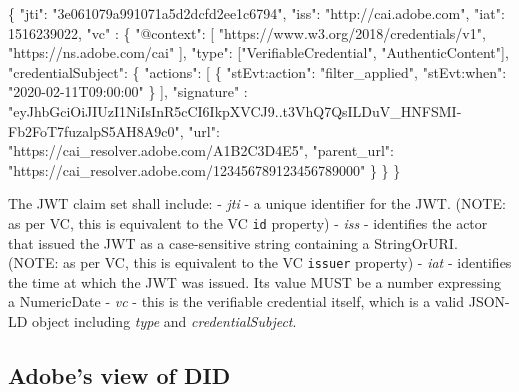 \documentclass[
]{article}
\newenvironment{Shaded}{}{}
\newcommand{\DataTypeTok}[1]{\textcolor[rgb]{0.56,0.13,0.00}{#1}}
\newcommand{\DecValTok}[1]{\textcolor[rgb]{0.25,0.63,0.44}{#1}}
\newcommand{\FunctionTok}[1]{\textcolor[rgb]{0.02,0.16,0.49}{#1}}
\newcommand{\OtherTok}[1]{\textcolor[rgb]{0.00,0.44,0.13}{#1}}
\newcommand{\StringTok}[1]{\textcolor[rgb]{0.25,0.44,0.63}{#1}}
\begin{document}
\begin{Shaded}
\begin{Highlighting}[]
\FunctionTok{\{}
    \DataTypeTok{"jti"}\FunctionTok{:} \StringTok{"3e061079a991071a5d2dcfd2ee1c6794"}\FunctionTok{,}
    \DataTypeTok{"iss"}\FunctionTok{:} \StringTok{"http://cai.adobe.com"}\FunctionTok{,}
    \DataTypeTok{"iat"}\FunctionTok{:} \DecValTok{1516239022}\FunctionTok{,}
    \DataTypeTok{"vc"} \FunctionTok{:} \FunctionTok{\{}
        \DataTypeTok{"@context"}\FunctionTok{:} \OtherTok{[}
            \StringTok{"https://www.w3.org/2018/credentials/v1"}\OtherTok{,}
            \StringTok{"https://ns.adobe.com/cai"}
        \OtherTok{]}\FunctionTok{,}
            \DataTypeTok{"type"}\FunctionTok{:} \OtherTok{[}\StringTok{"VerifiableCredential"}\OtherTok{,} \StringTok{"AuthenticContent"}\OtherTok{]}\FunctionTok{,}
            \DataTypeTok{"credentialSubject"}\FunctionTok{:} \FunctionTok{\{}
            \DataTypeTok{"actions"}\FunctionTok{:} \OtherTok{[} \FunctionTok{\{} \DataTypeTok{"stEvt:action"}\FunctionTok{:} \StringTok{"filter\_applied"}\FunctionTok{,} \DataTypeTok{"stEvt:when"}\FunctionTok{:} \StringTok{"2020{-}02{-}11T09:00:00"} \FunctionTok{\}} \OtherTok{]}\FunctionTok{,}
            \DataTypeTok{"signature"} \FunctionTok{:} \StringTok{"eyJhbGciOiJIUzI1NiIsInR5cCI6IkpXVCJ9..t3VhQ7QsILDuV\_HNFSMI{-}Fb2FoT7fuzalpS5AH8A9c0"}\FunctionTok{,}
            \DataTypeTok{"url"}\FunctionTok{:} \StringTok{"https://cai\_resolver.adobe.com/A1B2C3D4E5"}\FunctionTok{,}
            \DataTypeTok{"parent\_url"}\FunctionTok{:} \StringTok{"https://cai\_resolver.adobe.com/123456789123456789000"}
        \FunctionTok{\}}
    \FunctionTok{\}}
\FunctionTok{\}}
\end{Highlighting}
\end{Shaded}

The JWT claim set shall include: - \emph{jti} - a unique identifier for
the JWT. (NOTE: as per VC, this is equivalent to the VC \texttt{id}
property) - \emph{iss} - identifies the actor that issued the JWT as a
case-sensitive string containing a StringOrURI. (NOTE: as per VC, this
is equivalent to the VC \texttt{issuer} property) - \emph{iat} -
identifies the time at which the JWT was issued. Its value MUST be a
number expressing a NumericDate - \emph{vc} - this is the verifiable
credential itself, which is a valid JSON-LD object including \emph{type}
and \emph{credentialSubject}.

\hypertarget{adobes-view-of-did}{%
\subsection{Adobe's view of DID}\label{adobes-view-of-did}}
\end{document}
